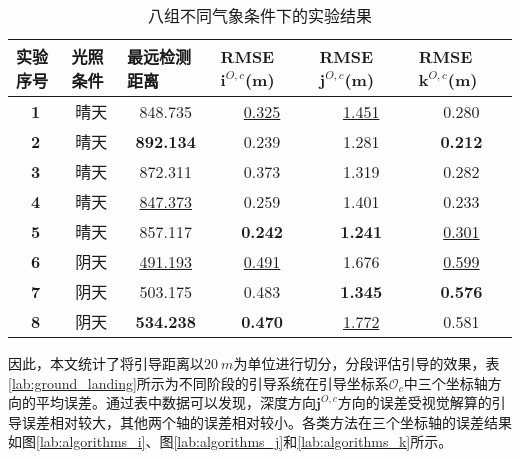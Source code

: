 \begin{table}[]
	\centering
	\caption{八组不同气象条件下的实验结果}
	\label{lab:eight_ground_landing}
	\begin{tabular}{cccccc}
		\hline
		\multicolumn{1}{l}{\textbf{实验序号}} & \multicolumn{1}{l}{\textbf{光照条件}} & \multicolumn{1}{l}{\textbf{最远检测距离}} & \multicolumn{1}{l}{\textbf{RMSE $\mathbf{i}^{O,c}$(m)}} & \multicolumn{1}{l}{\textbf{RMSE $\mathbf{j}^{O,c}$(m)}} & \multicolumn{1}{l}{\textbf{RMSE $\mathbf{k}^{O,c}$(m)}} \\ \hline
		\textbf{1} & 晴天 & 848.735 & \underline{0.325} & \underline{1.451} & 0.280 \\
		\textbf{2} & 晴天 & \textbf{892.134} & 0.239 & 1.281 & \textbf{0.212} \\
		\textbf{3} & 晴天 & 872.311 & 0.373 & 1.319 & 0.282 \\
		\textbf{4} & 晴天 & \underline{847.373} & 0.259 & 1.401 & 0.233 \\
		\textbf{5} & 晴天 & 857.117 & \textbf{0.242} & \textbf{1.241} & \underline{0.301} \\ \hline
		\textbf{6} & 阴天 & \underline{491.193} & \underline{0.491} & 1.676 & \underline{0.599} \\
		\textbf{7} & 阴天 & 503.175 & 0.483 & \textbf{1.345} & \textbf{0.576} \\
		\textbf{8} & 阴天 & \textbf{534.238} & \textbf{0.470} & \underline{1.772} & 0.581 \\ \hline
	\end{tabular}
\end{table}

因此，本文统计了将引导距离以$20\ m$为单位进行切分，分段评估引导的效果，表\ref{lab:ground_landing}所示为不同阶段的引导系统在引导坐标系$\mathcal{O}_c$中三个坐标轴方向的平均误差。通过表中数据可以发现，深度方向$\mathbf{j}^{O,c}$方向的误差受视觉解算的引导误差相对较大，其他两个轴的误差相对较小。各类方法在三个坐标轴的误差结果如图\ref{lab:algorithms_i}、图\ref{lab:algorithms_j}和\ref{lab:algorithms_k}所示。

